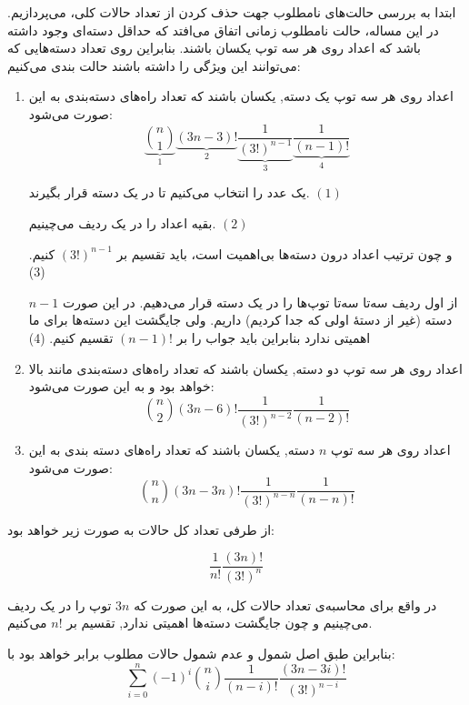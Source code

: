     ابتدا به بررسی حالت‌های نامطلوب جهت حذف کردن از تعداد حالات کلی، می‌پردازیم. در این مساله، حالت نامطلوب زمانی اتفاق می‌افتد که حداقل دسته‌ای وجود داشته باشد که اعداد روی هر سه توپ یکسان باشند. بنابراین روی تعداد دسته‌هایی که می‌توانند این ویژگی را داشته باشند حالت بندی می‌کنیم:
	\begin{enumerate}
	    \item 
    	اعداد روی هر سه توپ یک دسته, یکسان باشند که تعداد راه‌های دسته‌بندی به این صورت می‌شود:
    	$$\underbrace{{n  \choose 1}}_1\underbrace{(3n - 3)!}_2\underbrace{\frac{1}{(3!)^{n - 1}}}_3 \underbrace{\frac{1}{(n - 1)!}}_4$$
    	
    	یک عدد را انتخاب می‌کنیم تا در یک دسته قرار بگیرند.
    	$(1)$
    	
    	بقیه اعداد را در یک ردیف می‌چینیم.
    	$(2)$
    	
    	و چون ترتیب اعداد درون دسته‌ها بی‌اهمیت است، باید تقسیم بر $(3!)^{n-1}$ کنیم.
    	(3)
    	
    	از اول ردیف سه‌تا سه‌تا توپ‌ها را در یک دسته قرار می‌دهیم. در این صورت $n - 1$ دسته (غیر از دستهٔ اولی که جدا کردیم) داریم. ولی جایگشت این دسته‌ها برای ما اهمیتی ندارد بنابراین باید جواب را بر $(n-1)!$ تقسیم کنیم.
    	(4)
    	\item
    	اعداد روی هر سه توپ دو دسته, یکسان باشند که تعداد راه‌های دسته‌بندی مانند بالا خواهد بود و به این صورت می‌شود:
    	$${n  \choose 2}(3n - 6)! \frac{1}{(3!)^{n - 2}} \frac{1}{(n - 2)!}$$
    	\item
    	اعداد روی هر سه توپ $n$ دسته, یکسان باشند که تعداد راه‌های دسته بندی به این صورت می‌شود:
    	$${n \choose n}(3n - 3n)! \frac{1}{(3!)^{n - n}} \frac{1}{(n - n)!}$$
	\end{enumerate}
	از طرفی تعداد کل حالات به صورت زیر خواهد بود:
	
	$$\frac{1}{n!} \frac{(3n)!}{(3!)^n}$$
	
	در واقع برای محاسبه‌ی تعداد حالات کل، به این صورت که $3n$ توپ را در یک ردیف می‌چینیم و چون جایگشت دسته‌ها اهمیتی ندارد, تقسیم بر $n!$ می‌کنیم.
	
	بنابراین طبق اصل شمول و عدم شمول حالات مطلوب برابر خواهد بود با:
	$$\sum\limits_{i = 0}^n (-1)^i {n \choose i} \frac{1}{(n - i)!} \frac{(3n - 3i)!}{(3!)^{n - i}}$$
